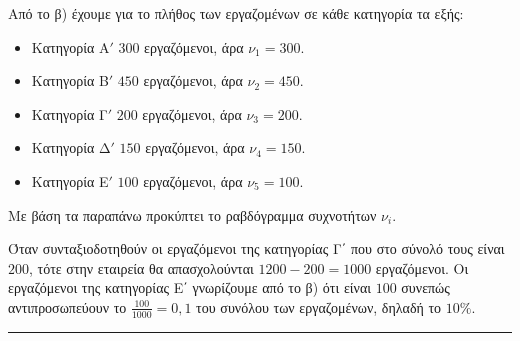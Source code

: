 \begin{alist}
\item 
\begin{rlist}
	\item Από το β) έχουμε για το πλήθος των εργαζομένων σε κάθε κατηγορία τα εξής:
	\begin{itemize}
		\item Κατηγορία Α$'$ $300$ εργαζόμενοι, άρα $\nu_1=300$.
		\item Κατηγορία Β$'$ $450$ εργαζόμενοι, άρα $\nu_2=450$.
		\item Κατηγορία Γ$'$ $200$ εργαζόμενοι, άρα $\nu_3=200$.
		\item Κατηγορία Δ$'$ $150$ εργαζόμενοι, άρα $\nu_4=150$.
		\item Κατηγορία Ε$'$ $100$ εργαζόμενοι, άρα $\nu_5=100$.
	\end{itemize}
	Με βάση τα παραπάνω προκύπτει το ραβδόγραμμα συχνοτήτων $\nu_i$.
	\begin{center}
	\end{center}
	
	\item Όταν συνταξιοδοτηθούν οι εργαζόμενοι της κατηγορίας Γ΄ που στο σύνολό τους είναι $200$, τότε στην εταιρεία θα απασχολούνται $1200-200=1000$ εργαζόμενοι. Οι εργαζόμενοι της κατηγορίας Ε΄ γνωρίζουμε από το β) ότι είναι $100$ συνεπώς αντιπροσωπεύουν το $\frac{100}{1000} = 0,1$ του συνόλου των εργαζομένων, δηλαδή το $10\%$.
\end{rlist}
\end{alist}
\vspace{6mm}
\noindent\rule{\textwidth}{0.4pt}
\vspace{6mm}

